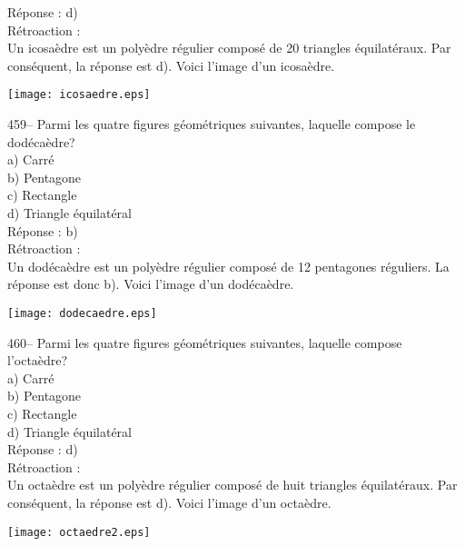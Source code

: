﻿\documentclass[letterpaper, 12pt]{article}
\begin{document}
R\'eponse : d)\\

R\'etroaction : \\
Un icosa\`edre est un poly\`edre r\'egulier compos\'e de 20 triangles
\'equilat\'eraux.  Par cons\'equent, la r\'eponse est d).  Voici l'image
d'un icosa\`edre.\\
    \begin{center}
    \texttt{[image: icosaedre.eps]}
    \end{center}


459-- Parmi les quatre figures g\'eom\'etriques suivantes, laquelle compose
le dod\'eca\`edre?\\
a) Carr\'e\\
b) Pentagone\\
c) Rectangle\\
d) Triangle \'equilat\'eral\\

R\'eponse : b)\\

R\'etroaction : \\
Un dod\'eca\`edre est un poly\`edre r\'egulier compos\'e de 12 pentagones
r\'eguliers.  La r\'eponse est donc b).  Voici l'image d'un
dod\'eca\`edre.\\
    \begin{center}
    \texttt{[image: dodecaedre.eps]}
    \end{center}


460-- Parmi les quatre figures g\'eom\'etriques suivantes, laquelle compose
l'octa\`edre?\\
a) Carr\'e\\
b) Pentagone\\
c) Rectangle\\
d) Triangle \'equilat\'eral\\

R\'eponse : d)\\

R\'etroaction : \\
Un octa\`edre est un poly\`edre r\'egulier compos\'e de huit triangles
\'equilat\'eraux.  Par cons\'equent, la r\'eponse est d).  Voici l'image
d'un octa\`edre.\\
    \begin{center}
    \texttt{[image: octaedre2.eps]}
    \end{center}
\end{document}
